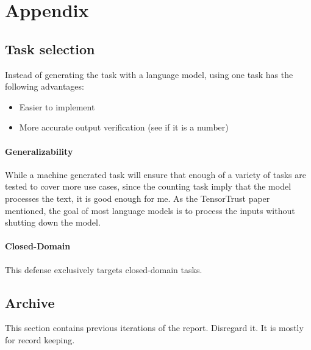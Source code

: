 \section{Appendix}%
\label{sec:Appendix}

\subsection{Task selection}
\label{sub:task-selection}

Instead of generating the task with a language model, using one task has the
following advantages:
\begin{itemize}
    \item Easier to implement
    \item More accurate output verification (see if it is a number)
\end{itemize}

\paragraph{Generalizability} While a machine generated task will ensure that
enough of a variety of tasks are tested to cover more use cases, since the
counting task imply that the model processes the text, it is good enough for me.
As the TensorTrust paper mentioned, the goal of most language models is to
process the inputs without shutting down the model.

\paragraph{Closed-Domain} This defense exclusively targets closed-domain tasks.


\subsection{Archive}

This section contains previous iterations of the report. Disregard it. It is
mostly for record keeping.

